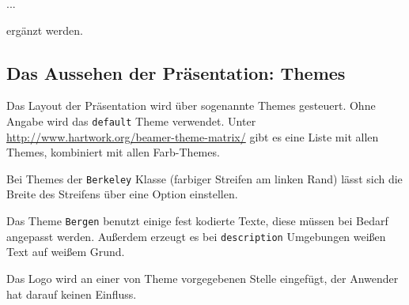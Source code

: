 \begin{lfgwcode}{}
{
...
}
\end{lfgwcode}

ergänzt werden.

\subsection{Das Aussehen der Präsentation: Themes}

Das Layout der Präsentation wird über sogenannte Themes gesteuert. Ohne
Angabe wird das \texttt{default} Theme verwendet. Unter
\url{http://www.hartwork.org/beamer-theme-matrix/} gibt es eine Liste mit
allen Themes, kombiniert mit allen Farb-Themes.

\begin{lfgwcode}{}
{
}
\end{lfgwcode}

Bei Themes der \texttt{Berkeley} Klasse (farbiger Streifen am linken Rand)
lässt sich die Breite des Streifens über eine Option einstellen.

Das Theme \texttt{Bergen} benutzt einige fest kodierte Texte, diese müssen
bei Bedarf angepasst werden.  Außerdem erzeugt es bei \texttt{description}
Umgebungen weißen Text auf weißem Grund.

Das Logo wird an einer von Theme vorgegebenen Stelle eingefügt, der Anwender
hat darauf keinen Einfluss.

